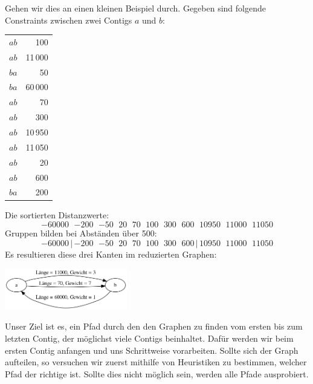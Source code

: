 Gehen wir dies an einen kleinen Beispiel durch. Gegeben sind folgende Constraints zwischen zwei Contigs $a$ und $b$:
\begin{center}
\begin{tabular}{lr}
$a$\quad $b$\quad &100\\
$a$\quad $b$\quad &11\,000\\
$b$\quad $a$\quad &50\\
$b$\quad $a$\quad &60\,000\\
$a$\quad $b$\quad &70\\
$a$\quad $b$\quad &300\\
$a$\quad $b$\quad &10\,950\\
$a$\quad $b$\quad &11\,050\\
$a$\quad $b$\quad &20\\
$a$\quad $b$\quad &600\\
$b$\quad $a$\quad &200
\end{tabular}
\end{center}
Die sortierten Distanzwerte:
\[-60000\ \ \,{-200}\ \ \,{-50}\ \ \,20\ \ \,70\ \ \,100\ \ \,300\ \ \,600\ \ \,10950\ \ \,11000\ \ \,11050\]
Gruppen bilden bei Abständen über 500:
\[-60000\,|\, {-200}\ \ \,{-50}\ \ \,20\ \ \,70\ \ \,100\ \ \,300\ \ \,600\, |\, 10950\ \ \,11000\ \ \,11050\]
Es resultieren diese drei Kanten im reduzierten Graphen:

\begin{center}
\includegraphics[width=0.4\textwidth]{bilder/dreikannten}
\end{center}


Unser Ziel ist es, ein Pfad durch den den Graphen zu finden vom ersten bis zum letzten Contig, der möglichst viele Contigs beinhaltet.
Dafür werden wir beim ersten Contig anfangen und uns Schrittweise vorarbeiten. Sollte sich der Graph aufteilen, so versuchen wir zuerst mithilfe von Heuristiken zu bestimmen, welcher Pfad der richtige ist. Sollte dies nicht möglich sein, werden alle Pfade ausprobiert.

